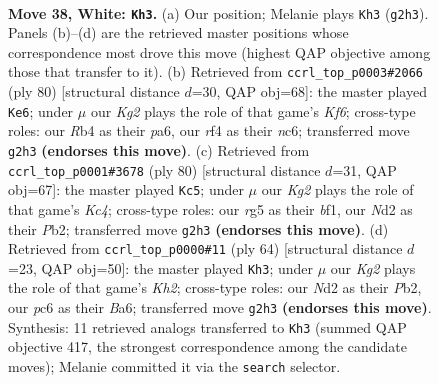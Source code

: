 \documentclass[11pt]{article}
\begin{document}
\clearpage

\begin{figure}[p]\centering
\begin{subfigure}{0.46\textwidth}\centering
\resizebox{\linewidth}{!}{%
\newchessgame
\chessboard[
  setfen={5k2/8/2p5/6rp/1R3r2/P7/1B1N2K1/8 w - - 0 38},
  showmover=false,
  pgfstyle=straightmove, color=movearrow, markmove={g2-h3}
]}
\caption{}
\end{subfigure}\hfill
\begin{subfigure}{0.46\textwidth}\centering
\resizebox{\linewidth}{!}{%
\newchessgame
\chessboard[
  setfen={4k3/2B4R/p1n2K2/P7/8/5r1p/8/8 w - - 2 41},
  showmover=false,
  pgfstyle=straightmove, color=movearrow, markmove={f6-e6}
]}
\caption{}
\end{subfigure}
\\[4pt]
\begin{subfigure}{0.46\textwidth}\centering
\resizebox{\linewidth}{!}{%
\newchessgame
\chessboard[
  setfen={8/1k5p/p7/4R3/2K2B2/5rP1/1P6/5b2 w - - 1 41},
  showmover=false,
  pgfstyle=straightmove, color=movearrow, markmove={c4-c5}
]}
\caption{}
\end{subfigure}\hfill
\begin{subfigure}{0.46\textwidth}\centering
\resizebox{\linewidth}{!}{%
\newchessgame
\chessboard[
  setfen={6k1/2R5/B7/p2R2rp/8/8/1P3r1K/8 w - - 0 33},
  showmover=false,
  pgfstyle=straightmove, color=movearrow, markmove={h2-h3}
]}
\caption{}
\end{subfigure}
\caption{\textbf{Move 38, White: \texttt{Kh3}.} (a) Our position; Melanie plays \texttt{Kh3} (\texttt{g2h3}). Panels (b)--(d) are the retrieved master positions whose correspondence most drove this move (highest QAP objective among those that transfer to it). (b) Retrieved from \texttt{ccrl\_top\_p0003\#2066} (ply 80) [structural distance $d$=30, QAP obj=68]: the master played \texttt{Ke6}; under $\mu$ our \emph{Kg2} plays the role of that game's \emph{Kf6}; cross-type roles: our \emph{R}b4 as their \emph{p}a6, our \emph{r}f4 as their \emph{n}c6; transferred move \texttt{g2h3} \textbf{(endorses this move)}. (c) Retrieved from \texttt{ccrl\_top\_p0001\#3678} (ply 80) [structural distance $d$=31, QAP obj=67]: the master played \texttt{Kc5}; under $\mu$ our \emph{Kg2} plays the role of that game's \emph{Kc4}; cross-type roles: our \emph{r}g5 as their \emph{b}f1, our \emph{N}d2 as their \emph{P}b2; transferred move \texttt{g2h3} \textbf{(endorses this move)}. (d) Retrieved from \texttt{ccrl\_top\_p0000\#11} (ply 64) [structural distance $d$=23, QAP obj=50]: the master played \texttt{Kh3}; under $\mu$ our \emph{Kg2} plays the role of that game's \emph{Kh2}; cross-type roles: our \emph{N}d2 as their \emph{P}b2, our \emph{p}c6 as their \emph{B}a6; transferred move \texttt{g2h3} \textbf{(endorses this move)}. Synthesis: 11 retrieved analogs transferred to \texttt{Kh3} (summed QAP objective 417, the strongest correspondence among the candidate moves); Melanie committed it via the \texttt{search} selector.}
\label{fig:thought-m74}
\end{figure}
\end{document}
